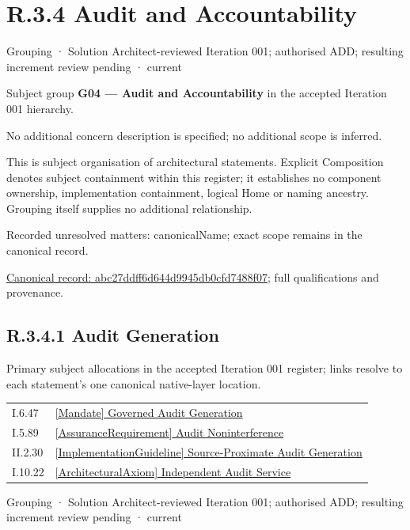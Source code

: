 \section*{R.3.4 Audit and Accountability}
\label{navigation:R.3.4}

\label{element:abc27ddff6d644d9945db0cfd7488f07}
{\small Grouping · Solution Architect-reviewed Iteration 001; authorised ADD; resulting increment review pending · current}\par

Subject group \textbf{G04 — Audit and Accountability} in the accepted Iteration 001 hierarchy.



No additional concern description is specified; no additional scope is inferred.



This is subject organisation of architectural statements. Explicit Composition denotes subject containment within this register; it establishes no component ownership, implementation containment, logical Home or naming ancestry. Grouping itself supplies no additional relationship.


{\small Recorded unresolved matters: canonicalName; exact scope remains in the canonical record.}\par
{\footnotesize \href{../../../../continuum/grouping/abc27ddff6d644d9945db0cfd7488f07.md}{Canonical record: abc27ddff6d644d9945db0cfd7488f07}; full qualifications and provenance.}\par
\subsection*{R.3.4.1 Audit Generation}
\label{navigation:R.3.4.1}

Primary subject allocations in the accepted Iteration 001 register; links resolve to each statement’s one canonical native-layer location.\par
\begin{longtable}{p{.22\linewidth}p{.73\linewidth}}
I.6.47 & \hyperref[element:d388ee6fb1d24ca886b2802cfb42c30e]{[Mandate] Governed Audit Generation} \\
I.5.89 & \hyperref[element:ccea3a4dbd494cbe99c525ff2e87db26]{[AssuranceRequirement] Audit Noninterference} \\
II.2.30 & \hyperref[element:427d41b9416943d4a362470a965baea5]{[ImplementationGuideline] Source-Proximate Audit Generation} \\
I.10.22 & \hyperref[element:41fa01556ade4f22a35288b072113767]{[ArchitecturalAxiom] Independent Audit Service} \\
\end{longtable}
\label{element:40416671099a46678ac5dfc3d0d615cf}
{\small Grouping · Solution Architect-reviewed Iteration 001; authorised ADD; resulting increment review pending · current}\par

